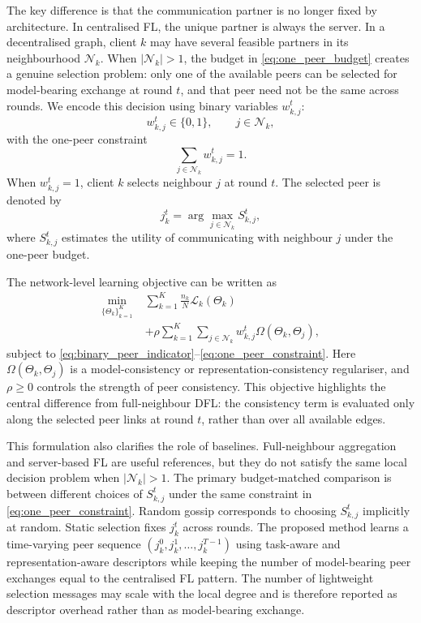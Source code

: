 \documentclass[conference]{IEEEtran}
\newcommand{\rev}[1]{{\color{red}#1}}
\begin{document}
The key difference is that the communication partner is no longer fixed by architecture. In centralised FL, the unique partner is always the server. In a decentralised graph, client $k$ may have several feasible partners in its neighbourhood $\mathcal{N}_k$. When $|\mathcal{N}_k|>1$, the budget in \eqref{eq:one_peer_budget} creates a genuine selection problem: only one of the available peers can be \rev{selected for model-bearing exchange} at round $t$, and that peer need not be the same across rounds. We encode this decision using binary variables $w_{k,j}^t$:
\begin{equation}
    w_{k,j}^{t}\in\{0,1\},
    \qquad j\in\mathcal{N}_k,
    \label{eq:binary_peer_indicator}
\end{equation}
with the one-peer constraint
\begin{equation}
    \sum_{j\in\mathcal{N}_k} w_{k,j}^{t}=1.
    \label{eq:one_peer_constraint}
\end{equation}
When $w_{k,j}^t=1$, client $k$ selects neighbour $j$ at round $t$. The selected peer is denoted by
\begin{equation}
    j_k^t = \arg\max_{j\in\mathcal{N}_k} S_{k,j}^{t},
    \label{eq:selection_general}
\end{equation}
where $S_{k,j}^{t}$ estimates the utility of communicating with neighbour $j$ under the one-peer budget.

The network-level learning objective can be written as
\begin{equation}
\begin{aligned}
    \min_{\{\Theta_k\}_{k=1}^{K}}\;&
    \sum_{k=1}^{K}\frac{n_k}{N}\mathcal{L}_k(\Theta_k) \\
    &+\rho\sum_{k=1}^{K}\sum_{j\in\mathcal{N}_k}
    w_{k,j}^{t}\Omega(\Theta_k,\Theta_j),
\end{aligned}
    \label{eq:global_dfl_objective}
\end{equation}
subject to \eqref{eq:binary_peer_indicator}--\eqref{eq:one_peer_constraint}. Here $\Omega(\Theta_k,\Theta_j)$ is a model-consistency or representation-consistency regulariser, and $\rho\geq0$ controls the strength of peer consistency. This objective highlights the central difference from full-neighbour DFL: the consistency term is evaluated only along the selected peer links at round $t$, rather than over all available edges.

This formulation also clarifies the role of baselines. Full-neighbour aggregation and server-based FL are useful references, but they do not satisfy the same local decision problem when $|\mathcal{N}_k|>1$. The primary budget-matched comparison is between different choices of $S_{k,j}^{t}$ under the same constraint in \eqref{eq:one_peer_constraint}. Random gossip corresponds to choosing $S_{k,j}^{t}$ implicitly at random. Static selection fixes $j_k^t$ across rounds. The proposed method learns a time-varying peer sequence $(j_k^0,j_k^1,\dots,j_k^{T-1})$ using task-aware and representation-aware descriptors while keeping the number of \rev{model-bearing peer exchanges} equal to the centralised FL pattern. \rev{The number of lightweight selection messages may scale with the local degree and is therefore reported as descriptor overhead rather than as model-bearing exchange.}
\end{document}
